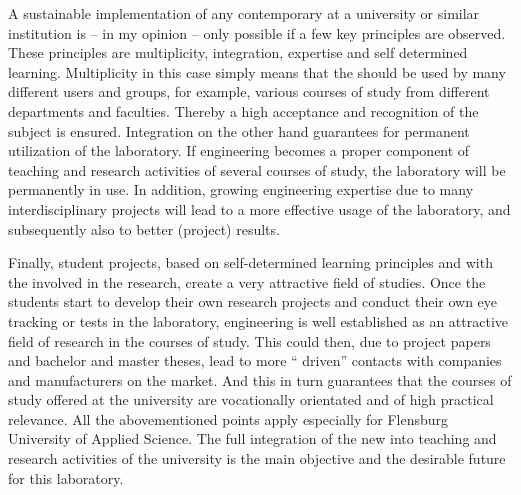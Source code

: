 \documentclass[output=paper]{langsci/langscibook}
\begin{document}
A sustainable implementation of any contemporary  at a university or similar institution is -- in my opinion -- only possible if a few key principles are observed. These principles are multiplicity, integration, expertise and self determined learning. Multiplicity in this case simply means that the  should be used by many different users and groups, for example, various courses of study from different departments and faculties. Thereby a high acceptance and recognition of the subject  is ensured. Integration on the other hand guarantees for permanent utilization of the laboratory. If  engineering becomes a proper component of teaching and research activities of several courses of study, the laboratory will be permanently in use. In addition, growing  engineering expertise due to many interdisciplinary projects will lead to a more effective usage of the laboratory, and subsequently also to better (project) results.


Finally, student projects, based on self-determined learning principles and with the  involved in the research, create a very attractive field of studies. Once the students start to develop their own research projects and conduct their own eye tracking or  tests in the laboratory,  engineering is well established as an attractive field of research in the courses of study. This could then, due to project papers and bachelor and master theses, lead to more `` driven'' contacts with companies and manufacturers on the market. And this in turn guarantees that the courses of study offered at the university are vocationally orientated and of high practical relevance. All the abovementioned points apply especially for Flensburg University of Applied Science. The full integration of the new  into teaching and research activities of the university is the main objective and the desirable future for this laboratory.
\end{document}
